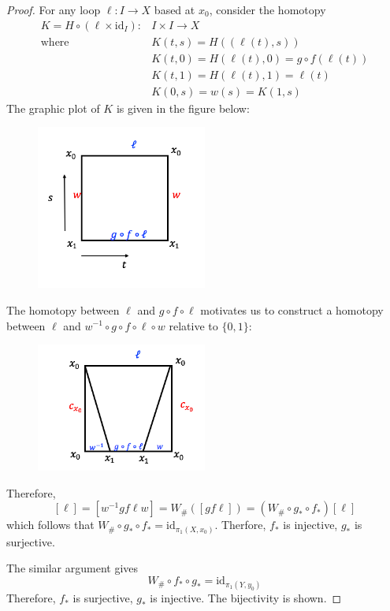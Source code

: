 \begin{proof}
For any loop $\ell:I\to X$ based at $x_0$, consider the homotopy 
\[
\begin{array}{ll}
K=H\circ(\ell\times\text{id}_I):&I\times I\to X\\
\text{where}&K(t,s) = H((\ell(t),s))\\
&K(t,0)=H(\ell(t),0) = g\circ f(\ell(t))\\
&K(t,1)=H(\ell(t),1) = \ell(t)\\
&K(0,s)=w(s)=K(1,s)
\end{array}
\]
The graphic plot of $K$ is given in the figure below:
\begin{figure}[H]
\centering
\includegraphics[width=0.5\textwidth]{week12/f_12_5}
\end{figure}
The homotopy between $\ell$ and $g\circ f\circ\ell$ motivates us to construct a homotopy between $\ell$ and $w^{-1}\circ g\circ f\circ \ell\circ w$ relative to $\{0,1\}$:
\begin{figure}[H]
\centering
\includegraphics[width=0.5\textwidth]{week12/f_12_6}
\end{figure}
Therefore,
\[
[\ell]=[w^{-1}gf\ell w] = W_{\#}([gf\ell])=(W_{\#}\circ g_*\circ f_*)[\ell]
\]
which follows that $W_{\#}\circ g_*\circ f_*=\text{id}_{\pi_1(X,x_0)}$. Therfore, $f_*$ is injective, $g_*$ is surjective.

The similar argument gives 
\[
W_{\#}\circ f_*\circ g_* = \text{id}_{\pi_1(Y,y_0)}
\]
Therefore, $f_*$ is surjective, $g_*$ is injective. The bijectivity is shown.

\end{proof}


